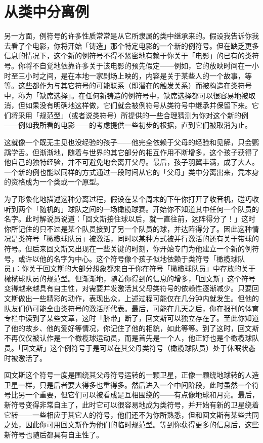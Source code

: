 \documentclass[
  12pt,
  twoside,
  openright,
  oldfontcommands,
]{memoir}
\begin{document}
\section{从类中分离例}

另一方面，例符号的许多性质常常是从它所隶属的类中继承来的。假设我告诉你我去看了个电影，你将开始「铸造」那个特定电影的一个新的例符号。但在缺乏更多信息的情况下，这个新的例符号不得不紧密地有赖于你关于「电影」的已有的类符号。你将不自觉地依靠许多关于该电影的预先假定------例如，它的放映时间在一小时至三小时之间，是在本地一家剧场上映的，内容是关于某些人的一个故事，等等。这些都作为与其它符号的可能联系（即潜在的触发关系）而被构造在类符号中，称为「缺席选择」。在任何新铸造的例符号中，缺席选择都可以很容易地被取消，但如果没有明确地这样做，它们就会被例符号从类符号中继承并保留下来。它们将采用「规范型」（或者说类符号）所提供的一些合理猜测为你对这个新的例------例如我所看的电影------的考虑提供一些初步的根据，直到它们被取消为止。

这就像一个既无主见也没经验的孩子------他完全依赖于父母的经验和见解，只会鹦鹉学舌。但渐渐地，随着与世界的其它部分的相互作用不断增多，这个孩子获得了他自己的独特经验，并不可避免地会离开父母。最后，孩子羽翼丰满，成了大人。一个新的例也能以同样的方式通过一段时间从它的「父母」类中分离出来，凭本身的资格成为一个类或一个原型。

为了形象化地描述这种分离过程，假设在某个周末的下午你打开了收音机，碰巧收听到两个「随机的」球队之间的一场橄榄球赛。开始你不知道其中任何一个队员的名字。此时解说员说道：「回文斯接住球以后，就一直往前，达阵得分了！」这时你所记住的只不过是某个队员接到了另一个队员的球，并达阵得分了。因此这种情况是类符号「橄榄球队员」被激活，同时以某种方式被并行激活的还有关于带球的符号。但后来回文斯又出现在一些关键的时刻，你开始专门为他建立一个新的例符号，或许以他的名字为中心。这个符号像个孩子似地依赖于类符号「橄榄球队员」：你关于回文斯的大部分想象都来自于你在符号「橄榄球队员」中存放的关于橄榄球队员的规范型。但渐渐地，随着你得到的信息的增多，「回文斯」这个符号变得越来越具有自主性，对需要并发激活其父母类符号的依赖性逐渐减少。只要回文斯做出一些精彩的动作，表现出众，上述过程可能仅在几分钟内就发生。但他的队友们仍可能全由类符号的激活所代表。最后，可能在几天之后，你在报刊的体育专栏中读到了某些文章，这时「脐带」断了，回文斯可以独立存在了。至此你知道了他的故乡、他的爱好等情况，你记住了他的相貌，如此等等。到了这时，回文斯不再仅仅被认作是一个橄榄球运动员，而是首先是一个人，他正好也是个橄榄球队员。「回文斯」这个例符号于是可以在其父母类符号（橄榄球队员）处于休眠状态时被激活了。

回文斯这个符号一度是围绕其父母符号运转的一颗卫星，正像一颗绕地球转的人造卫星一样，只是后者要大得多也重得多。然后进入一个中间阶段，此时虽然一个符号比另一个重要，但它们可以被看成是互相围绕的------有点像地球和月亮。最后，新符号变得非常自主了，此时它可以很容易地成为类符号，并开始有新的卫星绕着它转------一些相应于其它人的符号，他们还不为你所熟悉，但和回文斯有某些共同之处，因此你可用回文斯作为他们的临时规范型。等到你获得更多的信息后，这些新符号也随后都具有自主性了。
\end{document}
